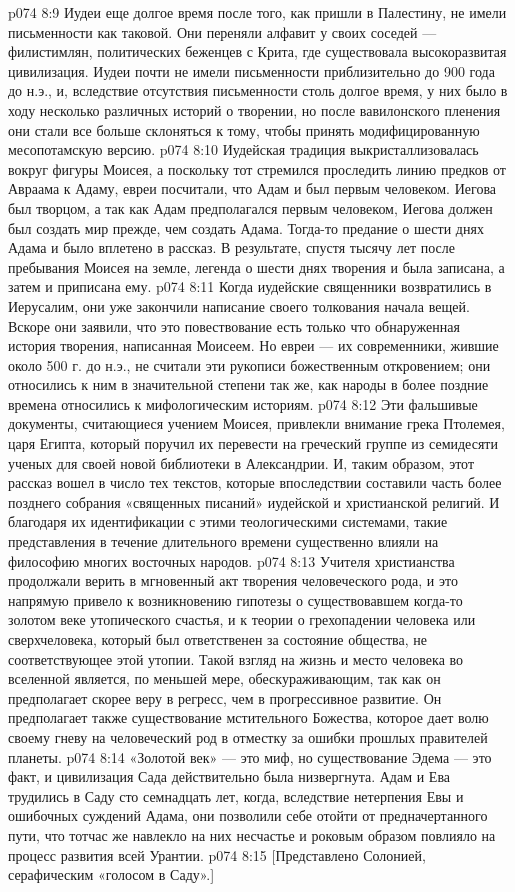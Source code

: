 \vs p074 8:9 Иудеи еще долгое время после того, как пришли в Палестину, не имели письменности как таковой. Они переняли алфавит у своих соседей --- филистимлян, политических беженцев с Крита, где существовала высокоразвитая цивилизация. Иудеи почти не имели письменности приблизительно до 900 года до н.э., и, вследствие отсутствия письменности столь долгое время, у них было в ходу несколько различных историй о творении, но после вавилонского пленения они стали все больше склоняться к тому, чтобы принять модифицированную месопотамскую версию.
\vs p074 8:10 Иудейская традиция выкристаллизовалась вокруг фигуры Моисея, а поскольку тот стремился проследить линию предков от Авраама к Адаму, евреи посчитали, что Адам и был первым человеком. Иегова был творцом, а так как Адам предполагался первым человеком, Иегова должен был создать мир прежде, чем создать Адама. Тогда\hyp{}то предание о шести днях Адама и было вплетено в рассказ. В результате, спустя тысячу лет после пребывания Моисея на земле, легенда о шести днях творения и была записана, а затем и приписана ему.
\vs p074 8:11 Когда иудейские священники возвратились в Иерусалим, они уже закончили написание своего толкования начала вещей. Вскоре они заявили, что это повествование есть только что обнаруженная история творения, написанная Моисеем. Но евреи --- их современники, жившие около 500 г. до н.э., не считали эти рукописи божественным откровением; они относились к ним в значительной степени так же, как народы в более поздние времена относились к мифологическим историям.
\vs p074 8:12 Эти фальшивые документы, считающиеся учением Моисея, привлекли внимание грека Птолемея, царя Египта, который поручил их перевести на греческий группе из семидесяти ученых для своей новой библиотеки в Александрии. И, таким образом, этот рассказ вошел в число тех текстов, которые впоследствии составили часть более позднего собрания «священных писаний» иудейской и христианской религий. И благодаря их идентификации с этими теологическими системами, такие представления в течение длительного времени существенно влияли на философию многих восточных народов.
\vs p074 8:13 Учителя христианства продолжали верить в мгновенный акт творения человеческого рода, и это напрямую привело к возникновению гипотезы о существовавшем когда\hyp{}то золотом веке утопического счастья, и к теории о грехопадении человека или сверхчеловека, который был ответственен за состояние общества, не соответствующее этой утопии. Такой взгляд на жизнь и место человека во вселенной является, по меньшей мере, обескураживающим, так как он предполагает скорее веру в регресс, чем в прогрессивное развитие. Он предполагает также существование мстительного Божества, которое дает волю своему гневу на человеческий род в отместку за ошибки прошлых правителей планеты.
\vs p074 8:14 \pc «Золотой век» --- это миф, но существование Эдема --- это факт, и цивилизация Сада действительно была низвергнута. Адам и Ева трудились в Саду сто семнадцать лет, когда, вследствие нетерпения Евы и ошибочных суждений Адама, они позволили себе отойти от предначертанного пути, что тотчас же навлекло на них несчастье и роковым образом повлияло на процесс развития всей Урантии.
\vsetoff
\vs p074 8:15 [Представлено Солонией, серафическим «голосом в Саду».]
